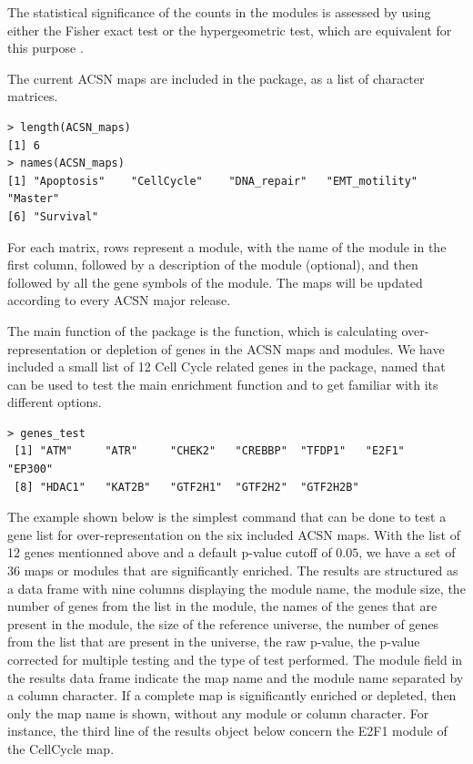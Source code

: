 \documentclass[article]{jss}
\begin{document}
The statistical significance of the counts in the modules is assessed by using
either the Fisher exact test \citep{fisher1922interpretation,
fisher1934statistical} or the hypergeometric test, which are equivalent for this
purpose \citep{rivals2007enrichment}.

The current ACSN maps are included in the  package, as a list of character matrices.

\begin{verbatim}
> length(ACSN_maps)
[1] 6
> names(ACSN_maps)
[1] "Apoptosis"    "CellCycle"    "DNA_repair"   "EMT_motility" "Master" 
[6] "Survival"    
\end{verbatim}

For each matrix, rows represent a module, with the name of the module in the
first column, followed by a description of the module (optional), and then
followed by all the gene symbols of the module. The maps will be updated
according to every ACSN major release.

The main function of the  package is the 
function, which is calculating over-representation or depletion of genes in the
ACSN maps and modules. We have included a small list of 12 Cell Cycle related
genes in the package, named  that can be used to test the main
enrichment function and to get familiar with its different options.

\begin{verbatim}
> genes_test
 [1] "ATM"     "ATR"     "CHEK2"   "CREBBP"  "TFDP1"   "E2F1"    "EP300"  
 [8] "HDAC1"   "KAT2B"   "GTF2H1"  "GTF2H2"  "GTF2H2B"
\end{verbatim}

The example shown below is the simplest command that can be done to test a gene
list for over-representation on the six included ACSN maps. With the list of 12
genes mentionned above and a default p-value cutoff of $0.05$, we have a set of
36 maps or modules that are significantly enriched. The results are structured
as a data frame with nine columns displaying the module name, the module size,
the number of genes from the list in the module, the names of the genes that are
present in the module, the size of the reference universe, the number of genes
from the list that are present in the universe, the raw p-value, the p-value
corrected for multiple testing and the type of test performed. The module field
in the results data frame indicate the map name and the module name separated by
a column character. If a complete map is significantly enriched or depleted,
then only the map name is shown, without any module or column character. For
instance, the third line of the results object below concern the E2F1 module of
the CellCycle map. 
\end{document}

